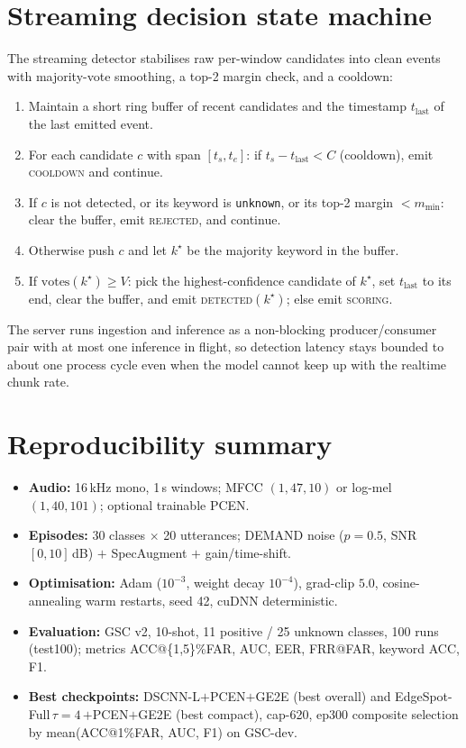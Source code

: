 \documentclass[12pt,a4paper]{article}
\renewcommand{\thesection}{\Roman{section}/}
\newcommand{\code}[1]{\texttt{\small #1}}
\begin{document}
\newpage
\appendix
\renewcommand{\thesection}{Appendix \Alph{section}:}
\setcounter{section}{0}

\section{Streaming decision state machine}\label{app:sm}

The streaming detector stabilises raw per-window candidates into clean events
with majority-vote smoothing, a top-2 margin check, and a cooldown:

\begin{enumerate}[leftmargin=1.8em,itemsep=1pt]
\item Maintain a short ring buffer of recent candidates and the timestamp
$t_{\text{last}}$ of the last emitted event.
\item For each candidate $c$ with span $[t_s,t_e]$: if $t_s - t_{\text{last}} <
C$ (cooldown), emit \textsc{cooldown} and continue.
\item If $c$ is not detected, or its keyword is \code{unknown}, or its top-2
margin $<m_{\min}$: clear the buffer, emit \textsc{rejected}, and continue.
\item Otherwise push $c$ and let $k^\star$ be the majority keyword in the buffer.
\item If $\text{votes}(k^\star)\ge V$: pick the highest-confidence candidate of
$k^\star$, set $t_{\text{last}}$ to its end, clear the buffer, and emit
\textsc{detected}$(k^\star)$; else emit \textsc{scoring}.
\end{enumerate}

The server runs ingestion and inference as a non-blocking producer/consumer pair
with at most one inference in flight, so detection latency stays bounded to about
one process cycle even when the model cannot keep up with the realtime chunk rate.

\section{Reproducibility summary}\label{app:repro}

\begin{itemize}[leftmargin=1.4em,itemsep=1pt]
\item \textbf{Audio:} 16\,kHz mono, 1\,s windows; MFCC $(1,47,10)$ or log-mel
$(1,40,101)$; optional trainable PCEN.
\item \textbf{Episodes:} 30 classes $\times$ 20 utterances; DEMAND noise
($p{=}0.5$, SNR $[0,10]$\,dB) $+$ SpecAugment $+$ gain/time-shift.
\item \textbf{Optimisation:} Adam ($10^{-3}$, weight decay $10^{-4}$), grad-clip
$5.0$, cosine-annealing warm restarts, seed 42, cuDNN deterministic.
\item \textbf{Evaluation:} GSC v2, 10-shot, 11 positive / 25 unknown classes,
100 runs (test100); metrics ACC@\{1,5\}\%FAR, AUC, EER, FRR@FAR, keyword ACC, F1.
\item \textbf{Best checkpoints:} DSCNN-L$+$PCEN$+$GE2E (best overall) and
EdgeSpot-Full\,$\tau{=}4$\,$+$PCEN$+$GE2E (best compact), cap-620, ep300 composite
selection by mean(ACC@1\%FAR, AUC, F1) on GSC-dev.
\end{itemize}
\end{document}
